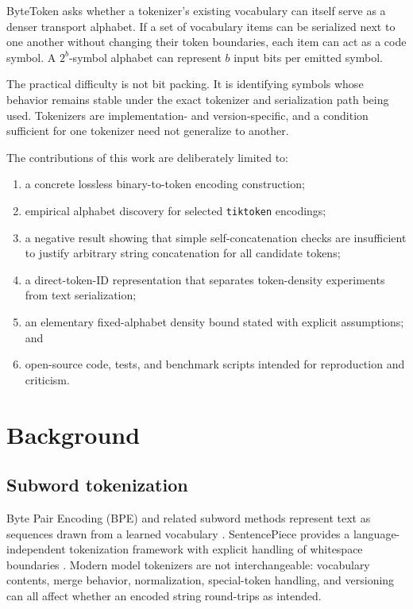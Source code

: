 \documentclass[11pt,a4paper]{article}
\begin{document}
ByteToken asks whether a tokenizer's existing vocabulary can itself serve as a denser transport alphabet. If a set of vocabulary items can be serialized next to one another without changing their token boundaries, each item can act as a code symbol. A \(2^b\)-symbol alphabet can represent \(b\) input bits per emitted symbol.

The practical difficulty is not bit packing. It is identifying symbols whose behavior remains stable under the exact tokenizer and serialization path being used. Tokenizers are implementation- and version-specific, and a condition sufficient for one tokenizer need not generalize to another.

The contributions of this work are deliberately limited to:
\begin{enumerate}
  \item a concrete lossless binary-to-token encoding construction;
  \item empirical alphabet discovery for selected \texttt{tiktoken} encodings;
  \item a negative result showing that simple self-concatenation checks are insufficient to justify arbitrary string concatenation for all candidate tokens;
  \item a direct-token-ID representation that separates token-density experiments from text serialization;
  \item an elementary fixed-alphabet density bound stated with explicit assumptions; and
  \item open-source code, tests, and benchmark scripts intended for reproduction and criticism.
\end{enumerate}

\section{Background}

\subsection{Subword tokenization}

Byte Pair Encoding (BPE) and related subword methods represent text as sequences drawn from a learned vocabulary \cite{sennrich2016bpe}. SentencePiece provides a language-independent tokenization framework with explicit handling of whitespace boundaries \cite{kudo2018sentencepiece}. Modern model tokenizers are not interchangeable: vocabulary contents, merge behavior, normalization, special-token handling, and versioning can all affect whether an encoded string round-trips as intended.
\end{document}
